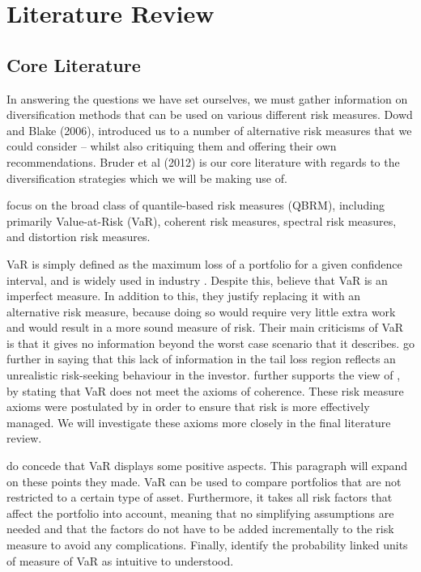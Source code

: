 \documentclass[12pt,a4paper]{article}
\begin{document}
\section{Literature Review}
\label{sec:LitRev}

\subsection{Core Literature}
\label{subsec:CorLit}

In answering the questions we have set ourselves, we must gather information on diversification methods that can be used on various different risk measures. Dowd and Blake (2006), introduced us to a number of alternative risk measures that we could consider – whilst also critiquing them and offering their own recommendations. Bruder et al (2012) is our core literature with regards to the diversification strategies which we will be making use of.

\cite{dowd2006after} focus on the broad class of quantile-based risk measures (QBRM), including primarily Value-at-Risk (VaR), coherent risk measures, spectral risk measures, and distortion risk measures.

VaR is simply defined as the maximum loss of a portfolio for a given confidence interval, and is widely used in industry \citep{consiglirisk}.  Despite this, \cite{dowd2006after} believe that VaR is an imperfect measure. In addition to this, they justify replacing it with an alternative risk measure, because doing so would require very little extra work and would result in a more sound measure of risk. Their main criticisms of VaR is that it gives no information beyond the worst case scenario that it describes. \cite{dowd2006after} go further in saying that this lack of information in the tail loss region reflects an unrealistic risk-seeking behaviour in the investor. \cite{ACERBI20021505} further supports the view of \cite{dowd2006after}, by stating that VaR does not meet the axioms of coherence. These risk measure axioms were postulated by \cite{artzner1999coherent} in order to ensure that risk is more effectively managed. We will investigate these axioms more closely in the final literature review.

\cite{dowd2006after} do concede that VaR displays some positive aspects. This paragraph will expand on these points they made. VaR can be used to compare portfolios that are not restricted to a certain type of asset. Furthermore, it takes all risk factors that affect the portfolio into account, meaning that no simplifying assumptions are needed and that the factors do not have to be added incrementally to the risk measure to avoid any complications. Finally, \cite{dowd2006after} identify the probability linked units of measure of VaR as intuitive to understood.
\end{document}
